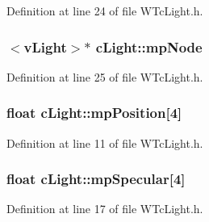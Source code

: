 Definition at line 24 of file WTcLight.h.

\hypertarget{classc_light_a6e718feeaad0a71e8654f85142bae362}{
\subsubsection[{mpNode}]{$<${\bf vLight}$>$$\ast$ {\bf cLight::mpNode}}}
\label{classc_light_a6e718feeaad0a71e8654f85142bae362}


Definition at line 25 of file WTcLight.h.

\hypertarget{classc_light_a5f4f6e1a73a23d7c7d7402316cf91459}{
\subsubsection[{mpPosition}]{\setlength{\rightskip}{0pt plus 5cm}float {\bf cLight::mpPosition}\mbox{[}4\mbox{]}}}
\label{classc_light_a5f4f6e1a73a23d7c7d7402316cf91459}


Definition at line 11 of file WTcLight.h.

\hypertarget{classc_light_aceff329257be92835c2962e77ad2d3dc}{
\subsubsection[{mpSpecular}]{\setlength{\rightskip}{0pt plus 5cm}float {\bf cLight::mpSpecular}\mbox{[}4\mbox{]}}}
\label{classc_light_aceff329257be92835c2962e77ad2d3dc}


Definition at line 17 of file WTcLight.h.

